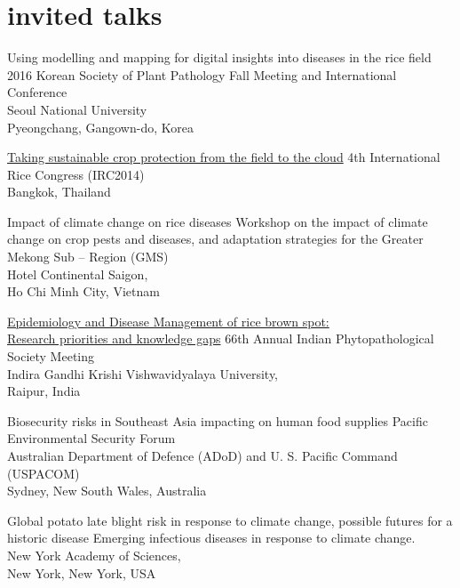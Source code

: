 \section*{invited talks}
\begin{entrylist}
 	{Using modelling and mapping for digital insights into diseases in the rice field}
 	{}
 	{2016 Korean Society of Plant Pathology Fall Meeting and International Conference\\Seoul National University\\Pyeongchang, Gangown-do, Korea}

	{\href{http://figshare.com/articles/Taking_Sustainable_Crop_Protection_From_the_Field_to_the_Cloud/1225800}{Taking sustainable crop protection from the field to the cloud}}
	{}
	{4th International Rice Congress (IRC2014)\\Bangkok, Thailand}

	{Impact of climate change on rice diseases}
	{}
	{Workshop on the impact of climate change on crop pests and diseases, and adaptation strategies for the Greater Mekong Sub -- Region (GMS)\\Hotel Continental Saigon,\\Ho Chi Minh City, Vietnam}

	{\href{http://figshare.com/articles/IPS_2014/1037569}{Epidemiology and Disease Management of rice brown spot:\\Research priorities and knowledge gaps}}
	{}
	{66th Annual Indian Phytopathological Society Meeting\\Indira Gandhi Krishi Vishwavidyalaya University,\\Raipur, India}

	{Biosecurity risks in Southeast Asia impacting on human food supplies}
	{}
	{Pacific Environmental Security Forum\\Australian Department of Defence (ADoD) and U. S. Pacific Command (USPACOM)\\Sydney, New South Wales, Australia}

	{Global potato late blight risk in response to climate change, possible futures for a historic disease}
  	{}
  	{Emerging infectious diseases in response to climate change.\\New York Academy of Sciences,\\New York, New York, USA}
\end{entrylist}
